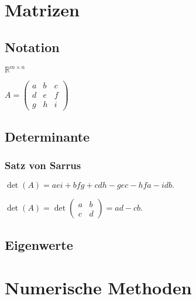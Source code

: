 \documentclass[10pt,a4paper]{article}
\begin{document}
\section{Matrizen}

\subsection{Notation}

$\mathbb{R}^{m\times n}$

$A = \begin{pmatrix} a & b & c \\ d & e & f \\ g & h & i \end{pmatrix} $


\subsection{Determinante}


\subsubsection{Satz von Sarrus}
$\det(A) = aei + bfg + cdh - gec -hfa -idb.$

$\det(A) = \det \begin{pmatrix} a & b \\ c & d \end{pmatrix} = ad - cb.$

\subsection{Eigenwerte}









\section{Numerische Methoden}
\end{document}
